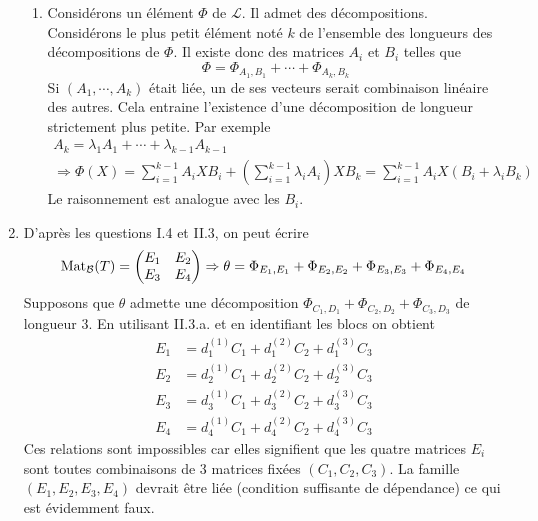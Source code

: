 \begin{enumerate}
\begin{enumerate}
 \item Considérons un élément $\Phi$ de $\mathcal{L}$. Il admet des décompositions. Considérons le plus petit élément noté $k$ de l'ensemble des longueurs des décompositions de $\Phi$. Il existe donc des matrices $A_i$ et $B_i$ telles que
\begin{displaymath}
 \Phi = \Phi_{A_1,B_1}+\cdots + \Phi_{A_k,B_k}
\end{displaymath}
Si $\left(A_1,\cdots,A_k\right)$ était liée, un de ses vecteurs serait combinaison linéaire des autres. Cela entraine l'existence d'une décomposition de longueur strictement plus petite. Par exemple
\begin{multline*}
 A_k = \lambda_1A_1+\cdots+\lambda_{k-1}A_{k-1}\\
\Rightarrow \Phi(X)=\sum_{i=1}^{k-1}A_iXB_i +\left(\sum_{i=1}^{k-1}\lambda_i A_i \right)  XB_k
=\sum_{i=1}^{k-1}A_iX\left(B_i +\lambda_i B_k\right) 
\end{multline*}
Le raisonnement est analogue avec les $B_i$. 
\end{enumerate}

\item D'après les questions I.4 et II.3, on peut écrire
\begin{displaymath}
\operatorname{Mat}_{\mathcal{B}}(T)= 
\begin{pmatrix}
E_{1} & E_{2} \\ 
E_{3} & E_{4}
\end{pmatrix}
\Rightarrow 
\theta = \Phi_{E_1,E_1}+\Phi_{E_2,E_2}+\Phi_{E_3,E_3}+\Phi_{E_4,E_4} 
\end{displaymath}
Supposons que $\theta$ admette une d\'{e}composition $\Phi_{C_1, D_1}+\Phi_{C_2, D_2}+\Phi_{C_3, D_3}$ de longueur 3. En utilisant II.3.a. et en identifiant les blocs on obtient 
\begin{align*}
E_{1} &= d_{1}^{(1)}C_{1}+d_{1}^{(2)}C_{2}+d_{1}^{(3)}C_{3} \\
E_{2} &= d_{2}^{(1)}C_{1}+d_{2}^{(2)}C_{2}+d_{2}^{(3)}C_{3} \\
E_{3} &= d_{3}^{(1)}C_{1}+d_{3}^{(2)}C_{2}+d_{3}^{(3)}C_{3} \\
E_{4} &= d_{4}^{(1)}C_{1}+d_{4}^{(2)}C_{2}+d_{4}^{(3)}C_{3}
\end{align*}
Ces relations sont impossibles car elles signifient que les quatre matrices $E_{i}$ sont toutes combinaisons de 3 matrices fix\'{e}es $(C_{1},C_{2},C_{3}) $. La famille $(E_{1},E_{2},E_{3},E_{4})$ devrait \^{e}tre li\'{e}e (condition suffisante de dépendance) ce qui est \'{e}videmment faux.


\end{enumerate}
